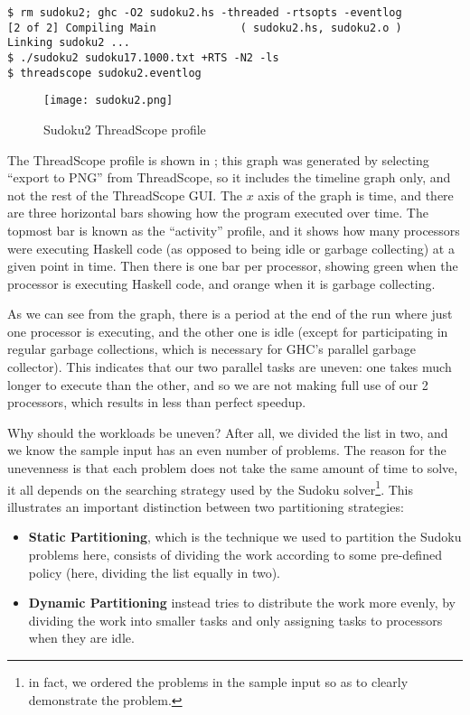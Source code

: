 {\small \begin{verbatim}
$ rm sudoku2; ghc -O2 sudoku2.hs -threaded -rtsopts -eventlog
[2 of 2] Compiling Main             ( sudoku2.hs, sudoku2.o )
Linking sudoku2 ...
$ ./sudoku2 sudoku17.1000.txt +RTS -N2 -ls
$ threadscope sudoku2.eventlog
\end{verbatim}}

\begin{figure}
\begin{center}
\texttt{[image: sudoku2.png]}
\end{center}
\caption{Sudoku2 ThreadScope profile}
\label{fig:sudoku2-threadscope}
\end{figure}

The ThreadScope profile is shown in ;
this graph was generated by selecting ``export to PNG'' from
ThreadScope, so it includes the timeline graph only, and not the rest
of the ThreadScope GUI.  The $x$ axis of the graph is time, and there
are three horizontal bars showing how the program executed over time.
The topmost bar is known as the ``activity'' profile, and it shows how
many processors were executing Haskell code (as opposed to being idle
or garbage collecting) at a given point in time.  Then there is one
bar per processor, showing green when the processor is executing
Haskell code, and orange when it is garbage collecting.

As we can see from the graph, there is a period at the end of the run
where just one processor is executing, and the other one is idle
(except for participating in regular garbage collections, which is
necessary for GHC's parallel garbage collector).  This indicates that
our two parallel tasks are uneven: one takes much longer to execute
than the other, and so we are not making full use of our 2 processors,
which results in less than perfect speedup.

Why should the workloads be uneven?  After all, we divided the list in
two, and we know the sample input has an even number of problems.  The
reason for the unevenness is that each problem does not take the same
amount of time to solve, it all depends on the searching strategy used
by the Sudoku solver\footnote{in fact, we ordered the problems in the
  sample input so as to clearly demonstrate the problem.}.  This
illustrates an important distinction between two partitioning
strategies:

\begin{itemize}
\item \textbf{Static Partitioning}, which is the technique we used to
  partition the Sudoku problems here, consists of dividing the work
  according to some pre-defined policy (here, dividing the list
  equally in two).

\item \textbf{Dynamic Partitioning} instead tries to distribute the
  work more evenly, by dividing the work into smaller tasks and only
  assigning tasks to processors when they are idle.
\end{itemize}

